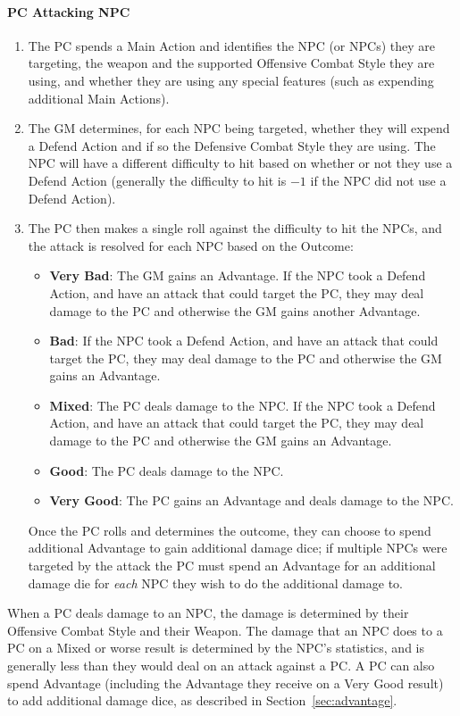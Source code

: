 \paragraph{PC Attacking NPC}
\begin{enumerate}
  \item The PC spends a Main Action and identifies the NPC (or NPCs) they are targeting, the weapon and the supported Offensive Combat Style they are using, and whether they are using any special features (such as expending additional Main Actions).
  \item The GM determines, for each NPC being targeted, whether they will expend a Defend Action and if so the Defensive Combat Style they are using. The NPC will have a different difficulty to hit based on whether or not they use a Defend Action (generally the difficulty to hit is $-1$ if the NPC did not use a Defend Action).
  \item The PC then makes a single roll against the difficulty to hit the NPCs, and the attack is resolved for each NPC based on the Outcome:
    \begin{itemize}
      \item \textbf{Very Bad}: The GM gains an Advantage. If the NPC took a Defend Action, and have an attack that could target the PC, they may deal damage to the PC and otherwise the GM gains another Advantage.
      \item \textbf{Bad}: If the NPC took a Defend Action, and have an attack that could target the PC, they may deal damage to the PC and otherwise the GM gains an Advantage.
      \item \textbf{Mixed}: The PC deals damage to the NPC. If the NPC took a Defend Action, and have an attack that could target the PC, they may deal damage to the PC and otherwise the GM gains an Advantage.
      \item \textbf{Good}: The PC deals damage to the NPC.
      \item \textbf{Very Good}: The PC gains an Advantage and deals damage to the NPC.
    \end{itemize}
    Once the PC rolls and determines the outcome, they can choose to spend additional Advantage to gain additional damage dice; if multiple NPCs were targeted by the attack the PC must spend an Advantage for an additional damage die for \emph{each} NPC they wish to do the additional damage to.
\end{enumerate}

When a PC deals damage to an NPC, the damage is determined by their Offensive Combat Style and their Weapon.
The damage that an NPC does to a PC on a Mixed or worse result is determined by the NPC's statistics, and is generally less than they would deal on an attack against a PC.
A PC can also spend Advantage (including the Advantage they receive on a Very Good result) to add additional damage dice, as described in Section~\ref{sec:advantage}.

